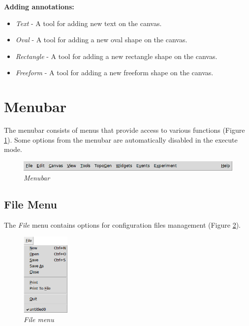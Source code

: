   \textbf{Adding annotations:} \hfill
  \begin{itemize}
  \item \emph{Text} - A tool for adding new text on the canvas.
  \item \emph{Oval} - A tool for adding a new oval shape on the canvas.
  \item \emph{Rectangle} - A tool for adding a new rectangle shape on the canvas.
  \item \emph{Freeform} - A tool for adding a new freeform shape on the canvas.
  \end{itemize}

  \section{Menubar}
  The menubar consists of menus that provide access to various functions (Figure
  \ref{fig:menubar}). Some options from the menubar are automatically disabled
  in the execute mode.

  \begin{figure}[H]
  \centering
  \vspace{10pt}
  \includegraphics[width=\textwidth]{./images/menubar.png}
  \caption{\emph{Menubar}}
  \label{fig:menubar}
  \end{figure}

  \subsection{File Menu}
  The \emph{File} menu contains options for configuration files management
(Figure \ref{fig:file_menu}).
  
  \begin{figure}[H]
  \centering
  \vspace{10pt}
  \includegraphics[width=0.21\textwidth]{./images/file_menu.png}
  \caption{\emph{File menu}}
  \label{fig:file_menu}
  \end{figure}
  
